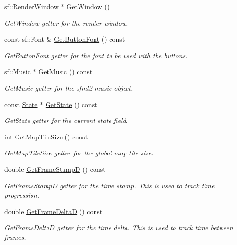 \begin{DoxyCompactItemize}
sf\-::\-Render\-Window $\ast$ \hyperlink{class_game_a14241d779a3aa1dd9f4bb68cd018bbe8}{Get\-Window} ()
\begin{DoxyCompactList}\small\item\em Get\-Window getter for the render window. \end{DoxyCompactList}\item 
const sf\-::\-Font \& \hyperlink{class_game_ac508be317e5c3a7d7c41df0f9c740a96}{Get\-Button\-Font} () const 
\begin{DoxyCompactList}\small\item\em Get\-Button\-Font getter for the font to be used with the buttons. \end{DoxyCompactList}\item 
sf\-::\-Music $\ast$ \hyperlink{class_game_a156aeef24e86a468033121036fed239c}{Get\-Music} () const 
\begin{DoxyCompactList}\small\item\em Get\-Music getter for the sfml2 music object. \end{DoxyCompactList}\item 
const \hyperlink{class_state}{State} $\ast$ \hyperlink{class_game_affa409c844370f25a5419a1f5225b0b5}{Get\-State} () const 
\begin{DoxyCompactList}\small\item\em Get\-State getter for the current state field. \end{DoxyCompactList}\item 
int \hyperlink{class_game_aa5913044e335b5624f52d6c95deed081}{Get\-Map\-Tile\-Size} () const 
\begin{DoxyCompactList}\small\item\em Get\-Map\-Tile\-Size getter for the global map tile size. \end{DoxyCompactList}\item 
double \hyperlink{class_game_a1a3becd8fb845889b4a2a86a32397393}{Get\-Frame\-Stamp\-D} () const 
\begin{DoxyCompactList}\small\item\em Get\-Frame\-Stamp\-D getter for the time stamp. This is used to track time progression. \end{DoxyCompactList}\item 
double \hyperlink{class_game_a85bcfed7671cd09b10f3ea3c1c7a52db}{Get\-Frame\-Delta\-D} () const 
\begin{DoxyCompactList}\small\item\em Get\-Frame\-Delta\-D getter for the time delta. This is used to track time between frames. \end{DoxyCompactList}\item 

\end{DoxyCompactItemize}

